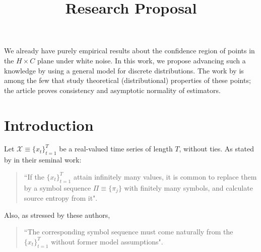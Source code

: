 \documentclass[12pt]{article}
\title{Research Proposal}
\begin{document}
	\maketitle
	
	We already have purely empirical results about the confidence region of points in the $H\times C$ plane under white noise.
	In this work, we propose advancing such a knowledge by using a general model for discrete distributions.
	The work by \citet{OrdinalPatternProbabilities} is among the few that study theoretical (distributional) properties of these points; the article proves consistency and asymptotic normality of estimators.
	
	\section{Introduction}
	
	Let ${\mathcal X} \equiv \{x_t\}_{t=1}^{T}$ be a real-valued time series of length $T$, without ties. 
	As stated by \citet{PermutationEntropyBandtPompe} in their seminal work:  
	\begin{quote}
		``If the $\{x_t\}_{t=1}^{T}$ attain infinitely many values, it is common to replace them by a symbol sequence 
		$\Pi \equiv \{\pi_j\}$ with finitely many symbols, and calculate source entropy from it".
	\end{quote}
	Also, as stressed by these authors, 
	\begin{quote}
		``The corresponding symbol sequence must come 
		naturally from the $\{x_t\}_{t=1}^{T}$ without former model assumptions".
	\end{quote}
	
\end{document}
